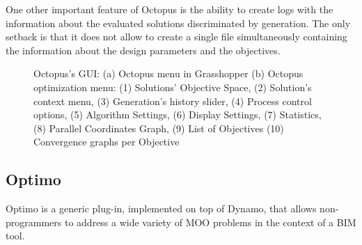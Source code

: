 	One other important feature of Octopus is the ability to create logs with the information about the evaluated solutions discriminated by generation. The only setback is that it does not allow to create a single file simultaneously containing the information about the design parameters and the objectives. 
	
	\begin{figure}[htbp]
		\centering
		\hfill
		\caption[Octopus GUI]{Octopus's \ac{GUI}: (a) Octopus menu in Grasshopper (b) Octopus optimization menu: (1) Solutions' Objective Space, (2) Solution's context menu, (3) Generation's history slider, (4) Process control options, (5) Algorithm Settings, (6) Display Settings, (7) Statistics, (8) Parallel Coordinates Graph, (9) List of Objectives (10) Convergence graphs per Objective}
		\label{fig:octopus}
		
	\end{figure}
	
	
	\subsection{Optimo}
	\label{subsec:Optimo}
	
	Optimo \cite{OPTIMO} is a generic plug-in, implemented on top of Dynamo, that allows non-programmers to address a wide variety of \ac{MOO} problems in the context of a \ac{BIM} tool. 
	

